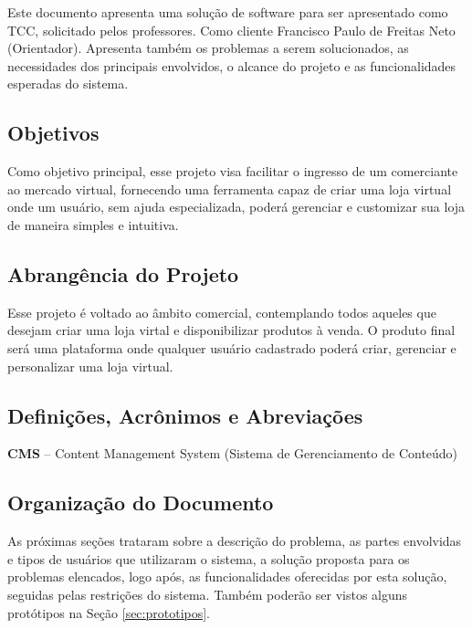 \documentclass[a4paper,12pt]{monografia}
\begin{document}
Este documento apresenta uma solução de software para ser apresentado como TCC, solicitado pelos professores. Como cliente Francisco Paulo de Freitas Neto (Orientador). Apresenta também os problemas a serem solucionados, as necessidades dos principais envolvidos, o alcance do projeto e as funcionalidades esperadas do sistema.

\subsection{Objetivos} %
\label{sec:objetivos}

Como objetivo principal, esse projeto visa facilitar o ingresso de um comerciante ao mercado virtual, fornecendo uma ferramenta capaz de criar uma loja virtual onde um usuário, sem ajuda especializada, poderá gerenciar e customizar sua loja de maneira simples e intuitiva.


\subsection{Abrangência do Projeto} %
\label{sec:abrengencia_do_projeto}

Esse projeto é voltado ao âmbito comercial, contemplando todos aqueles que desejam criar uma loja virtal e disponibilizar produtos à venda.
O produto final será uma plataforma onde qualquer usuário cadastrado poderá criar, gerenciar e personalizar uma loja virtual.


\subsection{Definições, Acrônimos e Abreviações} %
\label{sec:siglas}

\textbf{CMS} – Content Management System (Sistema de Gerenciamento de Conteúdo)

\subsection{Organização do Documento} %
\label{sec:organizacao_do_documento}

As próximas seções trataram sobre a descrição do problema, as partes envolvidas e tipos de usuários que utilizaram o sistema, a solução proposta para os problemas elencados, logo após, as funcionalidades oferecidas por esta solução, seguidas pelas restrições do sistema. Também poderão ser vistos alguns protótipos na Seção \ref{sec:prototipos}.
\end{document}
